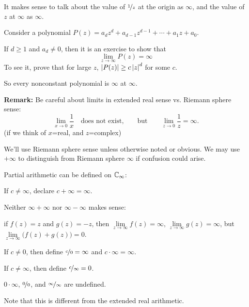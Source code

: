 \documentclass[10pt,aspectratio=169]{beamer}
\begin{document}
\begin{frame}
It makes sense to talk about the value of $\nicefrac{1}{z}$ at the origin
as $\infty$, and the value of $z$ at $\infty$ as $\infty$.

\medskip
\pause

Consider a polynomial $P(z) = a_d z^d + a_{d-1} z^{d-1} + \cdots + a_1 z +
a_0$.

\medskip
\pause

If $d \geq 1$ and $a_d \not= 0$, then it is an exercise to show that
\[
\lim_{z \to \infty} P(z) = \infty
\]
\pause
To see it, prove that for large $z$, $\left\lvert {P(z)} \right\rvert \geq c \left\lvert {z} \right\rvert^d$
for some $c$.

\medskip
\pause

So every nonconstant polynomial is $\infty$ at $\infty$.

\medskip
\pause

\textbf{Remark:}
Be careful about limits in extended real sense vs. Riemann sphere sense:
\begin{equation*}
\lim_{x \to 0} \frac{1}{x} \quad \text{does not exist,} \qquad \text{but} \qquad
\lim_{z \to 0} \frac{1}{z} = \infty .
\end{equation*}
(if we think of $x$=real, and $z$=complex)

\medskip
\pause

We'll use Riemann sphere sense unless otherwise noted or obvious.
We may use $+\infty$ to distinguish from Riemann sphere $\infty$
if confusion could arise.
\end{frame}

\begin{frame}
Partial arithmetic can be defined on ${\mathbb{C}}_\infty$:

\medskip
\pause

If $c \not= \infty$, declare $c+\infty = \infty$.

\medskip
\pause

Neither $\infty+\infty$ nor $\infty-\infty$ makes sense:

if $f(z) = z$ and $g(z) = -z$,
then $\lim\limits_{z \to \infty} f(z) = \infty$,
$\lim\limits_{z \to \infty} g(z) = \infty$, but $\lim\limits_{z \to \infty}
\bigl(f(z)+g(z)\bigr) = 0$.

\medskip
\pause

If $c \not= 0$, then define $\nicefrac{c}{0} = \infty$ and $c \cdot \infty =
\infty$.

\medskip
\pause

If $c \not= \infty$, then define $\nicefrac{c}{\infty} = 0$.

\medskip
\pause

$0 \cdot \infty$, $\nicefrac{0}{0}$, and $\nicefrac{\infty}{\infty}$ are undefined.

\medskip
\pause

Note that this is different from the extended real arithmetic.

\end{frame}
\end{document}
